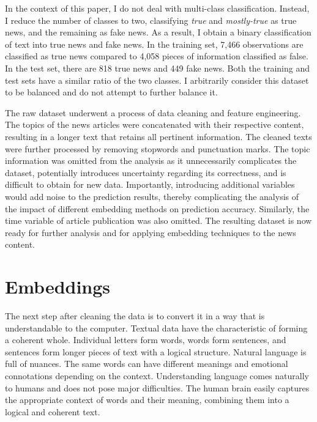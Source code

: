 In the context of this paper, I do not deal with multi-class classification. Instead, I reduce the number of classes to two, classifying \textit{true} and \textit{mostly-true} as true news, and the remaining as fake news. As a result, I obtain a binary classification of text into true news and fake news. In the training set, 7,466 observations are classified as true news compared to 4,058 pieces of information classified as false. In the test set, there are 818 true news and 449 fake news.  Both the training and test sets have a similar ratio of the two classes. I arbitrarily consider this dataset to be balanced and do not attempt to further balance it.

The raw dataset underwent %
a process of data cleaning and feature engineering. The topics of the news articles were concatenated with their respective content, resulting in a longer text that retains all pertinent information. The cleaned texts were further processed by removing stopwords and punctuation marks. The topic information was omitted from the analysis as it unnecessarily complicates the dataset, potentially introduces uncertainty regarding its correctness, and is difficult to obtain for new data. Importantly, introducing additional variables would add noise to the prediction results, thereby complicating the analysis of the impact of different embedding methods on prediction accuracy. Similarly, the time variable of article publication was also omitted. The resulting dataset is now ready for further analysis and for applying embedding techniques to the news content. %

\section{Embeddings}

The next step after cleaning the data is to convert it in a way that is understandable to the computer. Textual data have the characteristic of forming a coherent whole. Individual letters form words, words form sentences, and sentences form longer pieces of text with a logical structure. Natural language is full of nuances. The same words can have different meanings and emotional connotations depending on the context. Understanding language comes naturally to humans and does not pose major difficulties. The human brain easily captures the appropriate context of words and their meaning, combining them into a logical and coherent text.

